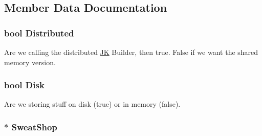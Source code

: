 \subsection{Member Data Documentation}
\hypertarget{classJKBuilder_1_1JK_a072479da68be17a25570325316eade23}{
\subsubsection[{Distributed}]{\setlength{\rightskip}{0pt plus 5cm}bool {\bf Distributed}}}
\label{classJKBuilder_1_1JK_a072479da68be17a25570325316eade23}


Are we calling the distributed \hyperlink{classJKBuilder_1_1JK}{JK} Builder, then true. False if we want the shared memory version. \hypertarget{classJKBuilder_1_1JK_a6324fcb7d27b80663a26f90a35f2e9b9}{
\subsubsection[{Disk}]{\setlength{\rightskip}{0pt plus 5cm}bool {\bf Disk}}}
\label{classJKBuilder_1_1JK_a6324fcb7d27b80663a26f90a35f2e9b9}


Are we storing stuff on disk (true) or in memory (false). \hypertarget{classJKBuilder_1_1JK_a09e4ffeb9ba2c95bf981da66beecc033}{
\subsubsection[{SweatShop}]{$\ast$ {\bf SweatShop}}}
\label{classJKBuilder_1_1JK_a09e4ffeb9ba2c95bf981da66beecc033}


